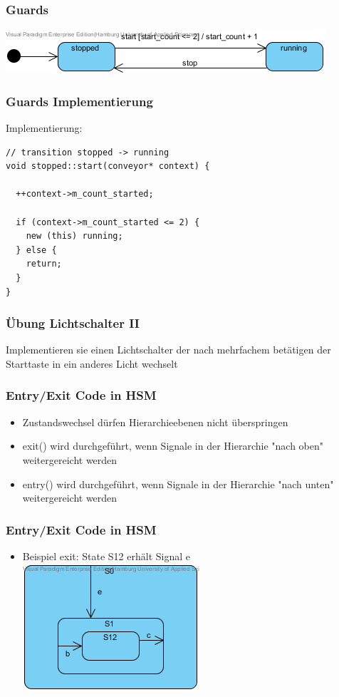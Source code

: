 \documentclass{beamer}
\begin{document}
\begin{frame}
 \frametitle{Guards}
 \begin{center}
   \includegraphics[scale=.8]{img/fsm_gof_guard_automat.png}
 \end{center}
\end{frame}

\begin{frame}[fragile]
 \frametitle{Guards Implementierung}
 Implementierung:
 \begin{lstlisting}
// transition stopped -> running
void stopped::start(conveyor* context) {

  ++context->m_count_started;

  if (context->m_count_started <= 2) {
    new (this) running;
  } else {
    return;
  }
}
 \end{lstlisting}
\end{frame}

\begin{frame}
 \frametitle{\"Ubung Lichtschalter II}
 Implementieren sie einen Lichtschalter der nach mehrfachem bet\"atigen der Starttaste in ein anderes Licht wechselt
\end{frame}

\begin{frame}
 \frametitle{Entry/Exit Code in HSM }
 \begin{itemize}
  \item Zustandswechsel d\"urfen Hierarchieebenen nicht \"uberspringen
  \item exit() wird durchgef\"uhrt, wenn Signale in der Hierarchie "nach oben" weitergereicht werden
  \item entry() wird  durchgef\"uhrt, wenn Signale in der Hierarchie "nach unten" weitergereicht werden
 \end{itemize}
\end{frame}

\begin{frame}
 \frametitle{Entry/Exit Code in HSM }
 \begin{itemize}
  \item Beispiel exit: State S12 erh\"alt Signal e\newline\newline
  \includegraphics[scale=.8]{img/beispiel_exitSM}
 \end{itemize}
\end{frame}
\end{document}
